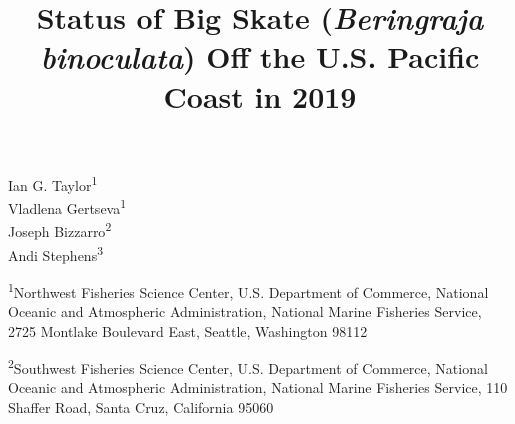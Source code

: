 \documentclass[12pt,]{article}
\title{Status of Big Skate (\emph{Beringraja binoculata}) Off the U.S. Pacific
Coast in 2019}
\author{}
\date{}
\begin{document}
\maketitle


\begin{center}
\thispagestyle{empty}

\vspace{.7cm}


\vspace{.5cm}

Ian G. Taylor\textsuperscript{1}\\
Vladlena Gertseva\textsuperscript{1}\\
Joseph Bizzarro\textsuperscript{2}\\
Andi Stephens\textsuperscript{3}\\

\vspace{.7cm}

\small

\textsuperscript{1}Northwest Fisheries Science Center, U.S. Department of Commerce, National Oceanic and Atmospheric Administration, National Marine Fisheries Service, 2725 Montlake Boulevard East, Seattle, Washington 98112\\

\vspace{.3cm}

\textsuperscript{2}Southwest Fisheries Science Center, U.S. Department of Commerce, National Oceanic and Atmospheric Administration, National Marine Fisheries Service, 110 Shaffer Road, Santa Cruz, California 95060\\


\end{center}
\end{document}
